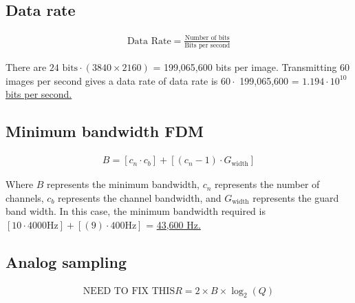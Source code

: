 
\setcounter{section}{3}

\subsection{Data rate}
\begin{align*}
	\text{Data Rate} = \frac{\text{Number of bits}}{\text{Bits per second}}
\end{align*}

There are $24 \text{ bits} \cdot (3840 \times 2160)$ = 199,065,600 bits per image. Transmitting 60 images per second gives a data rate of data rate is $60 \cdot $ 199,065,600 = \ul{$1.194 \cdot 10^{10}$ bits per second.}

\subsection{Minimum bandwidth FDM}
\begin{align*}
	B = [c_n \cdot c_b] + [(c_n - 1) \cdot G_{\text{width}}]
\end{align*}

Where $B$ represents the minimum bandwidth, $c_n$ represents the number of channels, $c_b$ represents the channel bandwidth, and $G_{\text{width}}$ represents the guard band width. In this case, the minimum bandwidth required is $[10 \cdot 4000 \text{Hz}] + [(9) \cdot 400 \text{Hz}]$ = \ul{43,600 Hz.}

\subsection{Analog sampling}
\begin{align*}
	\text{NEED TO FIX THIS}
	R = 2 \times B \times \log_2(Q)
\end{align*}

